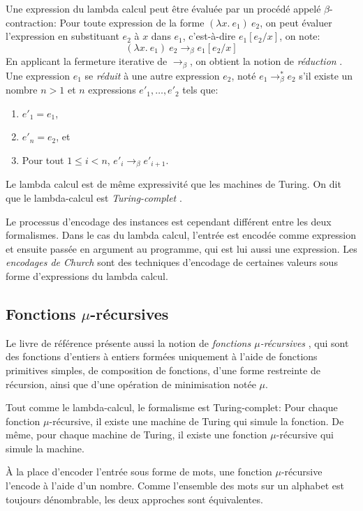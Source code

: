 Une expression du lambda calcul peut être évaluée par un procédé appelé $\beta$-contraction:
Pour toute expression de la forme $(\lambda x.\ e_1)\ e_2$, on peut évaluer l'expression en substituant $e_2$ à $x$ dans $e_1$, c'est-à-dire $e_1[e_2 / x]$, on note:
\[
(\lambda x.\ e_1)\ e_2 \to_\beta e_1[e_2 / x]
\]
En applicant la fermeture iterative de ${\to_\beta}$, on obtient la notion de \og \textit{réduction} \fg{}.
Une expression $e_1$ se \og \textit{réduit} \fg{} à une autre expression $e_2$, noté $e_1 \to_\beta^* e_2$ s'il existe un nombre $n > 1$ et $n$ expressions $e'_1, \dots, e'_2$ tels que:
\begin{enumerate}
\item $e'_1 = e_1$,
\item $e'_n = e_2$, et
\item Pour tout $1 \leq i < n$, $e'_i \to_\beta e'_{i+1}$.
\end{enumerate}

Le lambda calcul est de même expressivité que les machines de Turing.
On dit que le lambda-calcul est \og \textit{Turing-complet} \fg{}.

Le processus d'encodage des instances est cependant différent entre les deux formalismes.
Dans le cas du lambda calcul, l'entrée est encodée comme expression et ensuite passée en argument au programme, qui est lui aussi une expression.
Les \og \textit{encodages de Church} \fg{} sont des techniques d'encodage de certaines valeurs sous forme d'expressions du lambda calcul.

\subsection{Fonctions $\mu$-récursives}

Le livre de référence présente aussi la notion de \og \textit{fonctions $\mu$-récursives} \fg{}, qui sont des fonctions d'entiers à entiers formées uniquement à l'aide de fonctions primitives simples, de composition de fonctions, d'une forme restreinte de récursion, ainsi que d'une opération de minimisation notée $\mu$.

Tout comme le lambda-calcul, le formalisme est Turing-complet:
Pour chaque fonction $\mu$-récursive, il existe une machine de Turing qui simule la fonction.
De même, pour chaque machine de Turing, il existe une fonction $\mu$-récursive qui simule la machine.

À la place d'encoder l'entrée sous forme de mots, une fonction $\mu$-récursive l'encode à l'aide d'un nombre.
Comme l'ensemble des mots sur un alphabet est toujours dénombrable, les deux approches sont équivalentes.

